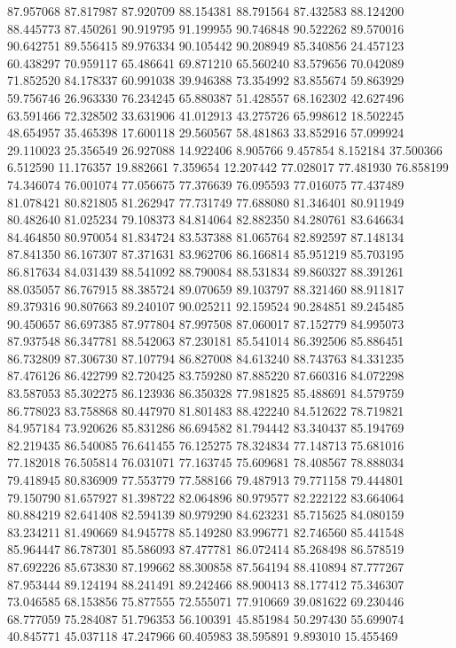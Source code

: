 87.957068
87.817987
87.920709
88.154381
88.791564
87.432583
88.124200
88.445773
87.450261
90.919795
91.199955
90.746848
90.522262
89.570016
90.642751
89.556415
89.976334
90.105442
90.208949
85.340856
24.457123
60.438297
70.959117
65.486641
69.871210
65.560240
83.579656
70.042089
71.852520
84.178337
60.991038
39.946388
73.354992
83.855674
59.863929
59.756746
26.963330
76.234245
65.880387
51.428557
68.162302
42.627496
63.591466
72.328502
33.631906
41.012913
43.275726
65.998612
18.502245
48.654957
35.465398
17.600118
29.560567
58.481863
33.852916
57.099924
29.110023
25.356549
26.927088
14.922406
8.905766
9.457854
8.152184
37.500366
6.512590
11.176357
19.882661
7.359654
12.207442
77.028017
77.481930
76.858199
74.346074
76.001074
77.056675
77.376639
76.095593
77.016075
77.437489
81.078421
80.821805
81.262947
77.731749
77.688080
81.346401
80.911949
80.482640
81.025234
79.108373
84.814064
82.882350
84.280761
83.646634
84.464850
80.970054
81.834724
83.537388
81.065764
82.892597
87.148134
87.841350
86.167307
87.371631
83.962706
86.166814
85.951219
85.703195
86.817634
84.031439
88.541092
88.790084
88.531834
89.860327
88.391261
88.035057
86.767915
88.385724
89.070659
89.103797
88.321460
88.911817
89.379316
90.807663
89.240107
90.025211
92.159524
90.284851
89.245485
90.450657
86.697385
87.977804
87.997508
87.060017
87.152779
84.995073
87.937548
86.347781
88.542063
87.230181
85.541014
86.392506
85.886451
86.732809
87.306730
87.107794
86.827008
84.613240
88.743763
84.331235
87.476126
86.422799
82.720425
83.759280
87.885220
87.660316
84.072298
83.587053
85.302275
86.123936
86.350328
77.981825
85.488691
84.579759
86.778023
83.758868
80.447970
81.801483
88.422240
84.512622
78.719821
84.957184
73.920626
85.831286
86.694582
81.794442
83.340437
85.194769
82.219435
86.540085
76.641455
76.125275
78.324834
77.148713
75.681016
77.182018
76.505814
76.031071
77.163745
75.609681
78.408567
78.888034
79.418945
80.836909
77.553779
77.588166
79.487913
79.771158
79.444801
79.150790
81.657927
81.398722
82.064896
80.979577
82.222122
83.664064
80.884219
82.641408
82.594139
80.979290
84.623231
85.715625
84.080159
83.234211
81.490669
84.945778
85.149280
83.996771
82.746560
85.441548
85.964447
86.787301
85.586093
87.477781
86.072414
85.268498
86.578519
87.692226
85.673830
87.199662
88.300858
87.564194
88.410894
87.777267
87.953444
89.124194
88.241491
89.242466
88.900413
88.177412
75.346307
73.046585
68.153856
75.877555
72.555071
77.910669
39.081622
69.230446
68.777059
75.284087
51.796353
56.100391
45.851984
50.297430
55.699074
40.845771
45.037118
47.247966
60.405983
38.595891
9.893010
15.455469
